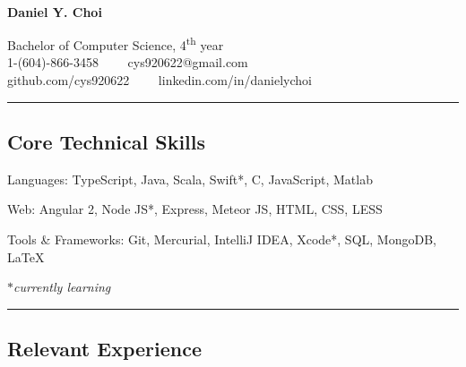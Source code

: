 \documentclass[10pt,letterpaper]{article}
\newenvironment{indentsection}[1]%
{\begin{list}{}%
	{\setlength{\leftmargin}{#1}}%
	\item[]%
}
{\end{list}}
\newcommand{\CPP}
{C\nolinebreak[4]\hspace{-.05em}\raisebox{.22ex}{\footnotesize\bf ++}}
\begin{document}

\begin{center}
\thispagestyle{firststyle}
{\LARGE \textbf{\\Daniel Y. Choi}}

Bachelor of Computer Science, 4\textsuperscript{th} year
\\
1-(604)-866-3458\ \ \textbullet
\ \ cys920622@gmail.com
\\
github.com/cys920622\ \ \textbullet
\ \ linkedin.com/in/danielychoi
\end{center}

\hrule
\vspace{-0.4em}

\subsection*{Core Technical Skills}

\begin{indentsection}{\parindent}
\begin{description*}
	\item[Languages:]
	TypeScript, Java, Scala, Swift*,  \CPP, JavaScript, Matlab
	\item[Web:]
	Angular 2, Node JS*, Express, Meteor JS, HTML, CSS, LESS
	\item[Tools \& Frameworks:]
	Git, Mercurial, IntelliJ IDEA, Xcode*, SQL, MongoDB, \LaTeX 
\end{description*}
\hfill{\emph{$\ast$currently learning}}
\end{indentsection}


\hrule
\vspace{-0.4em}

\subsection*{Relevant Experience}
\end{document}
